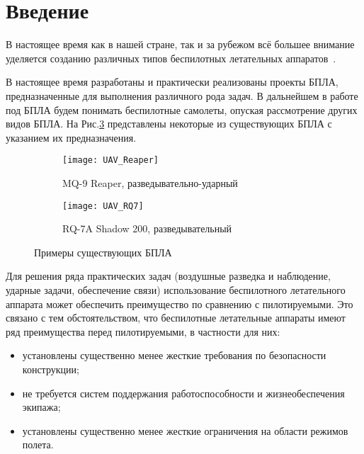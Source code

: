 \chapter*{Введение}

В настоящее время как в нашей стране, так и за рубежом всё большее внимание уделяется созданию различных типов беспилотных летательных аппаратов~\cite{UAVBook}. 


В настоящее время разработаны и практически реализованы проекты БПЛА, предназначенные для выполнения различного рода задач. В дальнейшем в работе под БПЛА будем понимать беспилотные самолеты, опуская рассмотрение других видов БПЛА. На Рис.\ref{fig:UAVs} представлены некоторые из существующих БПЛА с указанием их предназначения.


\begin{figure}[H]
        \begin{subfigure}[b]{0.47\textwidth}
                \texttt{[image: UAV\_Reaper]}
                \caption{MQ-9 Reaper, разведывательно-ударный} %
                \label{fig:UAV_Reaper}
        \end{subfigure}%
        \hspace{\fill}
        \begin{subfigure}[b]{0.47\textwidth}
                \texttt{[image: UAV\_RQ7]}
                \caption{RQ-7A Shadow 200, разведывательный}
                \label{fig:UAV_RQ7}
        \end{subfigure}
        \caption{Примеры существующих БПЛА}\label{fig:UAVs}
\end{figure}

Для решения ряда практических задач (воздушные разведка и наблюдение, ударные задачи, обеспечение связи) использование беспилотного летательного аппарата может обеспечить преимущество по сравнению с пилотируемыми. Это связано с тем обстоятельством, что беспилотные летательные аппараты имеют ряд преимущества перед пилотируемыми, в частности для них:

\begin{itemize}
\item установлены существенно менее жесткие требования по безопасности конструкции;
\item не требуется систем поддержания работоспособности и жизнеобеспечения экипажа;
\item установлены существенно менее жесткие ограничения на области режимов полета.
\end{itemize} 

